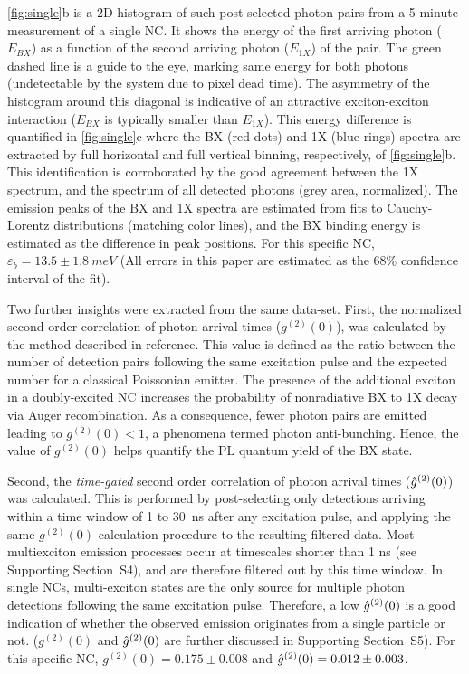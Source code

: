 \documentclass[journal=nalefd, manuscript=letter, layout=twocolumn]{achemso}
\newcommand{\supp}[1]{Supporting Section~S#1}
\begin{document}
\autoref{fig:single}b is a 2D-histogram of such post-selected photon pairs from a 5-minute measurement of a single  NC. It shows the energy of the first arriving photon ($E_{BX}$) as a function of the second arriving photon ($E_{1X}$) of the pair. The green dashed line is a guide to the eye, marking same energy for both photons (undetectable by the system due to pixel dead time). The asymmetry of the histogram around this diagonal is indicative of an attractive exciton-exciton interaction ($E_{BX}$ is typically smaller than $E_{1X}$). This energy difference is quantified in \autoref{fig:single}c where the BX (red dots) and 1X (blue rings) spectra are extracted by full horizontal and full vertical binning, respectively, of \autoref{fig:single}b. This identification is corroborated by the good agreement between the 1X spectrum, and the spectrum of all detected photons (grey area, normalized).
The emission peaks of the BX and 1X spectra are estimated from fits to Cauchy-Lorentz distributions (matching color lines), and the BX binding energy is estimated as the difference in peak positions. For this specific NC, $\varepsilon_b = 13.5\pm\SI{1.8}{meV}$ (All errors in this paper are estimated as the 68\% confidence interval of the fit).

Two further insights were extracted from the same data-set. First, the normalized second order correlation of photon arrival times ($g^{(2)}(0)$), was calculated by the method described in reference\cite{Lubin2019}. This value is defined as the ratio between the number of detection pairs following the same excitation pulse and the expected number for a classical Poissonian emitter. The presence of the additional exciton in a doubly-excited NC increases the probability of nonradiative BX to 1X decay via Auger recombination. As a consequence, fewer photon pairs are emitted leading to $g^{(2)}(0)<1$, a phenomena termed photon anti-bunching. Hence, the value of $g^{(2)}(0)$ helps quantify the PL quantum yield of the BX state\cite{Nair2011}. 

Second, the \emph{time-gated} second order correlation of photon arrival times ($\Hat{g}^{(2)}(0)$) was calculated. This is performed by post-selecting only detections arriving within a time window of 1 to \SI{30}{ns} after any excitation pulse, and applying the same $g^{(2)}(0)$ calculation procedure to the resulting filtered data. Most multiexciton emission processes occur at timescales shorter than 1 ns (see \supp{4}), and are therefore filtered out by this time window. In single NCs, multi-exciton states are the only source for multiple photon detections following the same excitation pulse. Therefore, a low $\Hat{g}^{(2)}(0)$ is a good indication of whether the observed emission originates from a single particle or not\cite{Mangum2013,Benjamin2020}. ($g^{(2)}(0)$ and $\Hat{g}^{(2)}(0)$ are further discussed in \supp{5}). For this specific NC, $g^{(2)}(0) = 0.175\pm0.008$ and $\Hat{g}^{(2)}(0) = 0.012\pm0.003$.
\end{document}
